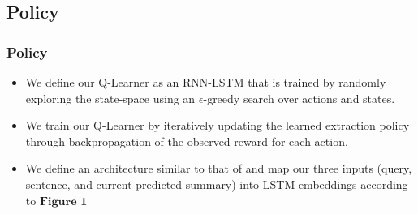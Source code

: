 \documentclass[]{beamer}
\begin{document}
	\subsection{Policy}
	\begin{frame}
			\frametitle{Policy}
			\begin{itemize}
				\item<1-> We define our Q-Learner as an RNN-LSTM that is trained by randomly exploring the state-space using an $\epsilon$-greedy search over actions and states. 
				\item<1->We train our Q-Learner by iteratively updating the learned extraction policy through backpropagation of the observed reward for each action.
				\item<1-> We define an architecture similar to that of \cite{narasimhan2015language} and map our three inputs (query, sentence, and current predicted summary) into LSTM embeddings according to $\textbf{Figure 1}$
			\end{itemize}
	\end{frame}
\end{document}
